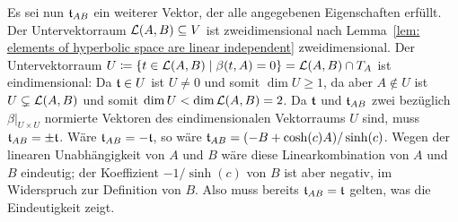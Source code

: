 \documentclass[a4paper,10pt,numbers=noenddot]{scrartcl}
\begin{document}
Es sei nun $\mathfrak{t}_{AB}$ ein weiterer Vektor, der alle angegebenen Eigenschaften erfüllt.
Der Untervektorraum $\operatorname{\mathcal{L}}(A,B) \subseteq V$ ist zweidimensional nach Lemma~\ref{lem: elements of hyperbolic space are linear independent} zweidimensional.
Der Untervektorraum $U \coloneqq \{t \in \operatorname{\mathcal{L}}(A,B) \mid \beta(t,A) = 0\} = \operatorname{\mathcal{L}}(A,B) \cap T_A$ ist eindimensional: Da $\mathfrak{t} \in U$ ist $U \neq 0$ und somit $\dim U \geq 1$, da aber $A \notin U$ ist $U \subsetneq \operatorname{\mathcal{L}}(A,B)$ und somit $\dim U < \dim \operatorname{\mathcal{L}}(A,B) = 2$.
Da $\mathfrak{t}$ und $\mathfrak{t}_{AB}$ zwei bezüglich $\beta|_{U \times U}$ normierte Vektoren des eindimensionalen Vektorraums $U$ sind, muss $\mathfrak{t}_{AB} = \pm \mathfrak{t}$.
Wäre $\mathfrak{t}_{AB} = -\mathfrak{t}$, so wäre $\mathfrak{t}_{AB} = (-B + \cosh(c) A)/\sinh(c)$.
Wegen der linearen Unabhängigkeit von $A$ und $B$ wäre diese Linearkombination von $A$ und $B$ eindeutig; der Koeffizient $-1/\sinh(c)$ von $B$ ist aber negativ, im Widerspruch zur Definition von $B$.
Also muss bereits $\mathfrak{t}_{AB} = \mathfrak{t}$ gelten, was die Eindeutigkeit zeigt.
\end{document}
